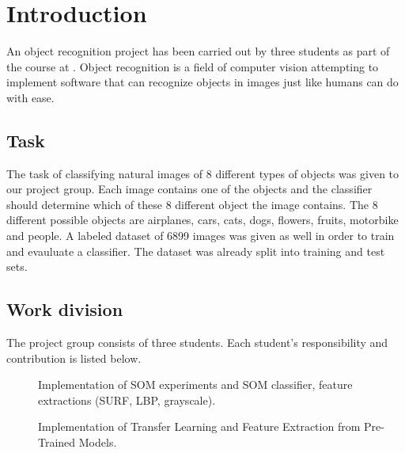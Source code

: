 \documentclass[doc/report.tex]{subfiles}
\begin{document}
\section{Introduction}
An object recognition project has been carried out by three students as part of
the course \courseName{} at \courseUniversity. Object recognition is a field of
computer vision attempting to implement software that can recognize objects in
images just like humans can do with ease.

\subsection{Task}
The task of classifying natural images of 8 different types of objects was
given to our project group. Each image contains one of the objects and the
classifier should determine which of these 8 different object the image
contains. The 8 different possible objects are airplanes, cars, cats, dogs,
flowers, fruits, motorbike and people. A labeled dataset of 6899 images was
given as well in order to train and evauluate a classifier. The dataset was
already split into training and test sets.

\subsection{Work division}
The project group consists of three students. Each student's responsibility and
contribution is listed below.

\begin{description}
    \item[\authorA] Implementation of SOM experiments and SOM classifier,
        feature extractions (SURF, LBP, grayscale).
    \item[\authorB] Implementation of Transfer Learning and Feature Extraction
        from Pre-Trained Models.
    \item[\authorC] %
\end{description}
    
\end{document}
